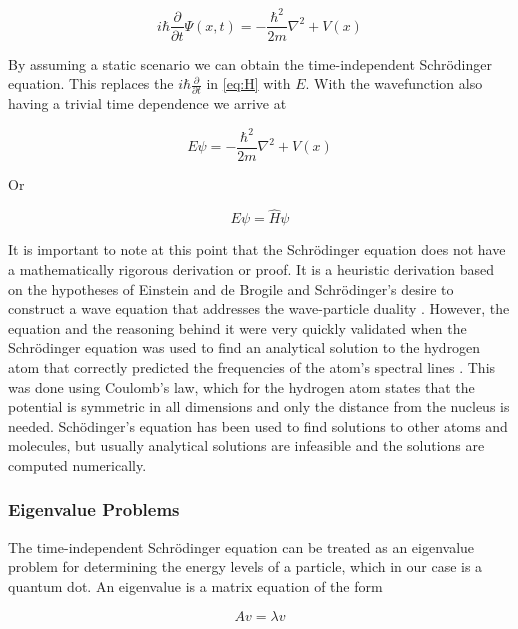\documentclass[authoryearcitations]{UoYCSproject}
\begin{document}
\begin{equation}
i\hbar\frac{\partial}{\partial t}\Psi (x,t) = -\frac{\hbar ^2}{2m}\nabla ^2 + V(x)
\label{eq:H}
\end{equation}

By assuming a static scenario we can obtain the time-independent Schr\"{o}dinger equation. This replaces
the $i\hbar \frac{\partial}{\partial t}$ in \ref{eq:H} with $E$. With the wavefunction also having a trivial time
dependence we arrive at

\begin{equation}
E\psi = -\frac{\hbar ^2}{2m}\nabla ^2 + V(x) 
\label{eq:timeIndependent}
\end{equation}


Or

\begin{equation}
E\psi = \hat{H}\psi  
\label{eq:eigenSchrodinger}
\end{equation}

It is important to note at this point that the Schr\"{o}dinger equation does not have a mathematically rigorous 
derivation or proof. It is a heuristic derivation based on the hypotheses of Einstein and de Brogile and Schr\"{o}dinger's
desire to construct a wave equation that addresses the wave-particle duality \cite{ricardo, qp}. %
However, the equation and the reasoning behind it were very quickly validated when the Schr\"{o}dinger equation was used
to find an analytical solution to the hydrogen atom that correctly predicted the frequencies of the atom's spectral lines
\cite{qp}. This was done using Coulomb's law, which for the hydrogen atom states that the potential is symmetric in all dimensions
and only the distance from the nucleus is needed. Sch\"{o}dinger's equation has been used to find solutions to other atoms and
molecules, but usually analytical solutions are infeasible and the solutions are computed numerically. 


\subsubsection{Eigenvalue Problems}
The time-independent Schr\"{o}dinger equation can be treated as an eigenvalue problem for determining the energy levels
of a particle, which in our case is a quantum dot. An eigenvalue is a matrix equation of the form

\begin{equation}
Av = \lambda v
\label{eq:eigenDef}
\end{equation}
\end{document}

